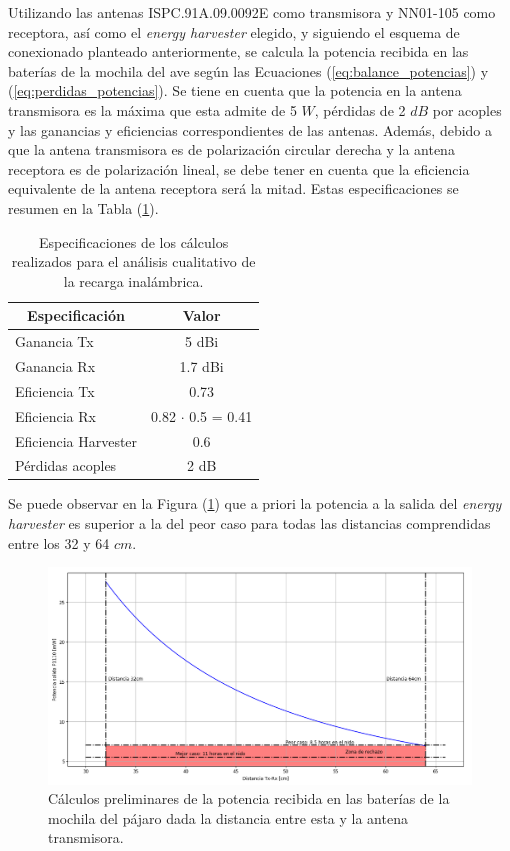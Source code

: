 Utilizando las antenas ISPC.91A.09.0092E como transmisora y NN01-105 como receptora, así como el \textit{energy harvester} elegido, y siguiendo el esquema de conexionado planteado anteriormente, se calcula la potencia recibida en las baterías de la mochila del ave según las Ecuaciones (\ref{eq:balance_potencias}) y (\ref{eq:perdidas_potencias}). Se tiene en cuenta que la potencia en la antena transmisora es la máxima que esta admite de 5 $W$, pérdidas de 2 $dB$ por acoples y las ganancias y eficiencias correspondientes de las antenas.  Además, debido a que la antena transmisora es de polarización circular derecha y la antena receptora es de polarización lineal, se debe tener en cuenta que la eficiencia equivalente de la antena receptora será la mitad. Estas especificaciones se resumen en la Tabla (\ref{tab:antenas_calc}).

\begin{table}[H]
\centering
\begin{tabular}{|l|c|}
\hline
\multicolumn{1}{|c|}{Especificación} & Valor            \\ \hline
Ganancia Tx                          & 5 dBi          \\ \hline
Ganancia Rx                          & 1.7 dBi      \\ \hline
Eficiencia Tx                        & 0.73             \\ \hline
Eficiencia Rx                        & 0.82 $\cdot$ 0.5 = 0.41 \\ \hline
Eficiencia Harvester                 & 0.6              \\ \hline
Pérdidas acoples                     & 2 dB           \\ \hline
\end{tabular}
\caption{Especificaciones de los cálculos realizados para el análisis cualitativo de la recarga inalámbrica.}
\label{tab:antenas_calc}
\end{table}

Se puede observar en la Figura (\ref{fig:antenas_preliminar}) que a priori la potencia a la salida del \textit{energy harvester} es superior a la del peor caso para todas las distancias comprendidas entre los 32 y 64 $cm$. 

\begin{figure}[H]
	\centering
	\includegraphics[width=\linewidth]{ImagenesFactibilidad/antenas_preliminar}
	\caption{Cálculos preliminares de la potencia recibida en las baterías de la mochila del pájaro dada la distancia entre esta y la antena transmisora.}
	\label{fig:antenas_preliminar}
\end{figure}

